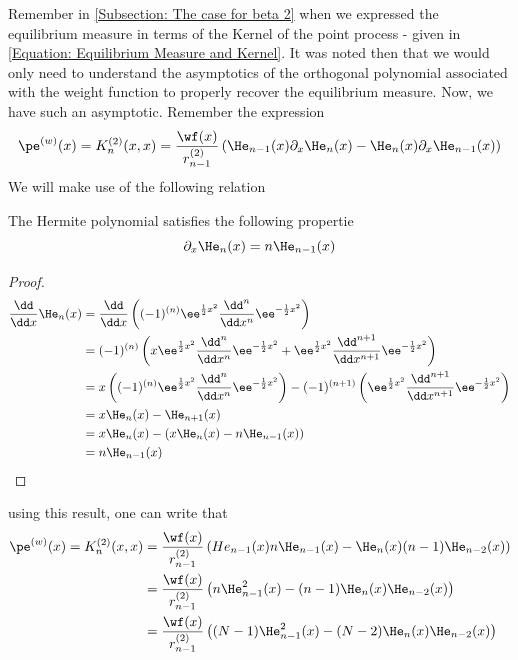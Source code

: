 Remember in \ref{Subsection: The case for beta 2} when we expressed the equilibrium measure in terms of the Kernel of the point process - given in \ref{Equation: Equilibrium Measure and Kernel}. It was noted then that we would only need to understand the asymptotics of the orthogonal polynomial associated with the weight function to properly recover the equilibrium measure. Now, we have such an asymptotic. Remember the expression
\begin{equation}
	\pe^{(w)}(x) = K_n^{(2)}(x, x) = \frac{\wf(x)}{r_{n-1}^{(2)}} \left( \He_{n-1}(x)\partial_x \He_n(x) - \He_{n}(x)\partial_x \He_{n-1}(x)  \right)
\end{equation}
We will make use of the following relation
\begin{definicao}
	The Hermite polynomial satisfies the following propertie
	\begin{equation}
		\partial_x \He_{n}(x) = n \He_{n-1}(x)
	\end{equation}
\end{definicao}
\begin{proof}
\begin{align}
		 \frac{\dd}{\dd x} \He_n(x) & = \frac{\dd}{\dd x} \left( (-1)^{(n)}\ee^{\frac{1}{2} x^2} \frac{\dd^n}{\dd x^n} \ee^{-\frac{1}{2} x^2} \right) \\
		 & = (-1)^{(n)}  \left( x \ee^{\frac{1}{2} x^2} \frac{\dd^n}{\dd x^n} \ee^{-\frac{1}{2} x^2} +  \ee^{\frac{1}{2} x^2} \frac{\dd^{n+1}}{\dd x^{n+1}} \ee^{-\frac{1}{2} x^2}  \right) \\
		 & =  x \left( (-1)^{(n)}  \ee^{\frac{1}{2} x^2} \frac{\dd^n}{\dd x^n} \ee^{-\frac{1}{2} x^2} \right) -   (-1)^{(n+1)} \left(  \ee^{\frac{1}{2} x^2} \frac{\dd^{n+1}}{\dd x^{n+1}} \ee^{-\frac{1}{2} x^2} \right)  \\
		 & = x \He_n(x) - \He_{n+1}(x) \\
		 & = x \He_n(x) - \left(  x\He_n(x) - n \He_{n-1}(x) \right) \\
		 & =  n \He_{n-1}(x) 
	\end{align}
\end{proof}
using this result, one can write that
\begin{align}
		\pe^{(w)}(x) = K_n^{(2)}(x, x) & = \frac{\wf(x)}{r_{n-1}^{(2)}} \left( He_{n-1}(x)  n \He_{n-1}(x) - \He_{n}(x)(n-1) \He_{n-2}(x)   \right) \\
		& = \frac{\wf(x)}{r_{n-1}^{(2)}} \left( n \He^2_{n-1}(x) - (n-1)  \He_{n}(x)\He_{n-2}(x)   \right) \\
		& = \frac{\wf(x)}{r_{n-1}^{(2)}} \left( (N-1) \He^2_{n-1}(x) - (N-2)  \He_{n}(x)\He_{n-2}(x)   \right) \\
\end{align}
